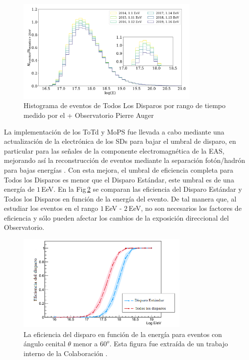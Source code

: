 \begin{figure}[H]
	\centering
	\includegraphics[width=0.8\textwidth]{histograma_AllTriggers.pdf}
  \caption{Histograma de eventos de  Todos Los Disparos por rango de tiempo medido por el +
  Observatorio Pierre Auger}
	\label{fig:TLD}
\end{figure}

La implementación de los ToTd y MoPS fue llevada a cabo mediante una actualización de la electrónica de los SDs para bajar el umbral de disparo, en particular para las señales de la componente electromagnética de la EAS, mejorando así la reconstrucción de eventos mediante la separación fotón/hadrón para bajas energías  \cite{pierre2013plans}. Con esta mejora, el umbral de eficiencia completa para Todos los Disparos es menor que el Disparo Estándar, este umbral es de una energía de $1\,$EeV. En la Fig\,\ref{fig:triggers} se comparan las eficiencia del Disparo Estándar y Todos los Disparos en función de la energía del evento. De tal manera que, al estudiar los eventos en el rango $1\,$EeV - $2\,$EeV,  no son necesarios los factores de eficiencia y sólo pueden afectar los cambios de la exposición direccional del Observatorio.


\begin{figure}[H]
  \centering
  \includegraphics[width=0.75\textwidth]{comparacion_triggers.png}
  \caption{La eficiencia del disparo en función de la energía para eventos con ángulo cenital $\theta$ menor a $60^o$. Esta figura fue extraída de un trabajo interno de la Colaboración {\cite{triggers_ref}}.}
  \label{fig:triggers}
\end{figure}


